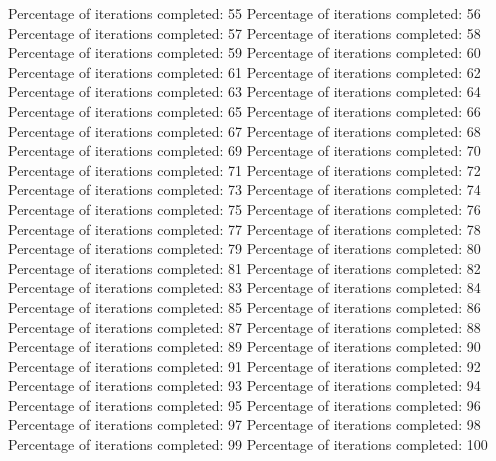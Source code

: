 \documentclass[12pt]{article}
\begin{document}
\begin{Schunk}
\begin{Soutput}
Percentage of iterations completed: 55 
Percentage of iterations completed: 56 
Percentage of iterations completed: 57 
Percentage of iterations completed: 58 
Percentage of iterations completed: 59 
Percentage of iterations completed: 60 
Percentage of iterations completed: 61 
Percentage of iterations completed: 62 
Percentage of iterations completed: 63 
Percentage of iterations completed: 64 
Percentage of iterations completed: 65 
Percentage of iterations completed: 66 
Percentage of iterations completed: 67 
Percentage of iterations completed: 68 
Percentage of iterations completed: 69 
Percentage of iterations completed: 70 
Percentage of iterations completed: 71 
Percentage of iterations completed: 72 
Percentage of iterations completed: 73 
Percentage of iterations completed: 74 
Percentage of iterations completed: 75 
Percentage of iterations completed: 76 
Percentage of iterations completed: 77 
Percentage of iterations completed: 78 
Percentage of iterations completed: 79 
Percentage of iterations completed: 80 
Percentage of iterations completed: 81 
Percentage of iterations completed: 82 
Percentage of iterations completed: 83 
Percentage of iterations completed: 84 
Percentage of iterations completed: 85 
Percentage of iterations completed: 86 
Percentage of iterations completed: 87 
Percentage of iterations completed: 88 
Percentage of iterations completed: 89 
Percentage of iterations completed: 90 
Percentage of iterations completed: 91 
Percentage of iterations completed: 92 
Percentage of iterations completed: 93 
Percentage of iterations completed: 94 
Percentage of iterations completed: 95 
Percentage of iterations completed: 96 
Percentage of iterations completed: 97 
Percentage of iterations completed: 98 
Percentage of iterations completed: 99 
Percentage of iterations completed: 100 
\end{Soutput}
\end{Schunk}
\normalsize
\end{document}
